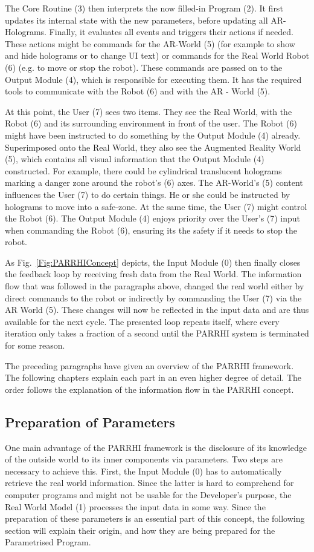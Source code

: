 The Core Routine (3) then interprets the now filled-in Program (2). It first updates its internal state with the new parameters, before updating all AR-Holograms. Finally, it evaluates all events and triggers their actions if needed. These actions might be commands for the AR-World (5) (for example to show and hide holograms or to change UI text) or commands for the Real World Robot (6) (e.g. to move or stop the robot). These commands are passed on to the Output Module (4), which is responsible for executing them. It has the required tools to communicate with the Robot (6) and with the AR - World (5). 

At this point, the User (7) sees two items. They see the Real World, with the Robot (6) and its surrounding environment in front of the user. The Robot (6) might have been instructed to do something by the Output Module (4) already. Superimposed onto the Real World, they also see the Augmented Reality World (5), which contains all visual information that the Output Module (4) constructed. For example, there could be cylindrical translucent holograms marking a danger zone around the robot's (6) axes. The AR-World's (5) content influences the User (7) to do certain things. He or she could be instructed by holograms to move into a safe-zone. At the same time, the User (7) might control the Robot (6). The Output Module (4) enjoys priority over the User's (7) input when commanding the Robot (6), ensuring its the safety if it needs to stop the robot.

As Fig.~\ref{Fig:PARRHIConcept} depicts, the Input Module (0) then finally closes the feedback loop by receiving fresh data from the Real World. The information flow that was followed in the paragraphs above, changed the real world either by direct commands to the robot or indirectly by commanding the User (7) via the AR World (5). These changes will now be reflected in the input data and are thus available for the next cycle. The presented loop repeats itself, where every iteration only takes a fraction of a second until the PARRHI system is terminated for some reason. 

The preceding paragraphs have given an overview of the PARRHI framework. The following chapters explain each part in an even higher degree of detail. The order follows the explanation of the information flow in the PARRHI concept.


\subsection{Preparation of Parameters}
One main advantage of the PARRHI framework is the disclosure of its knowledge of the outside world to its inner components via parameters. Two steps are necessary to achieve this. First, the Input Module (0) has to automatically retrieve the real world information. Since the latter is hard to comprehend for computer programs and might not be usable for the Developer’s purpose, the Real World Model (1) processes the input data in some way. Since the preparation of these parameters is an essential part of this concept, the following section will explain their origin, and how they are being prepared for the Parametrised Program.


